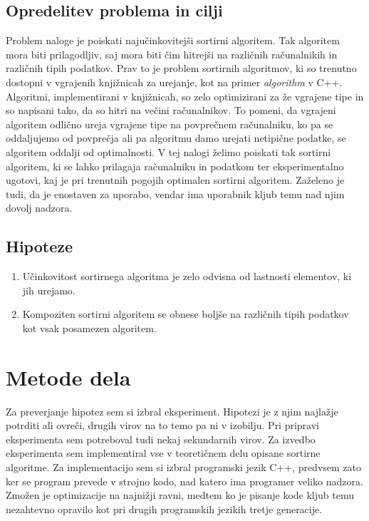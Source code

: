 \documentclass[a4paper,oneside,12pt]{article}
\begin{document}
\subsection{Opredelitev problema in cilji}
Problem naloge je poiskati najučinkovitejši sortirni algoritem. Tak algoritem
mora biti prilagodljiv, saj mora biti čim hitrejši na različnih računalnikih in
različnih tipih podatkov. Prav to je problem sortirnih algoritmov, ki so
trenutno dostopni v vgrajenih knjižnicah za urejanje, kot na primer
\emph{algorithm} v C++. Algoritmi, implementirani v knjižnicah, so zelo
optimizirani za že vgrajene tipe in so napisani tako, da so hitri na večini
računalnikov. To pomeni, da vgrajeni algoritem odlično ureja vgrajene tipe na
povprečnem računalniku, ko pa se oddaljujemo od povprečja ali pa algoritmu damo
urejati netipične podatke, se algoritem oddalji od optimalnosti. V tej nalogi
želimo poiskati tak sortirni algoritem, ki se lahko prilagaja računalniku in
podatkom ter eksperimentalno ugotovi, kaj je pri trenutnih pogojih optimalen
sortirni algoritem. Zaželeno je tudi, da je enostaven za uporabo, vendar ima uporabnik
kljub temu nad njim dovolj nadzora.

\subsection{Hipoteze}
\begin{enumerate}
  \item \label{hip:dif:type:dif:algo} Učinkovitost sortirnega
    algoritma je zelo odvisna od lastnosti elementov, ki jih urejamo.
  \item \label{hip:komp:vs:nekomp} Kompoziten sortirni algoritem se obnese boljše na različnih tipih podatkov kot vsak
    posamezen algoritem.
\end{enumerate}

\pagebreak
\mbox{}

\pagebreak

\section{Metode dela}
Za preverjanje hipotez sem si izbral eksperiment. Hipotezi je z njim najlažje
potrditi ali ovreči, drugih virov na to temo pa ni v izobilju. Pri pripravi eksperimenta
sem potreboval tudi nekaj sekundarnih virov. Za izvedbo eksperimenta sem implementiral vse 
v teoretičnem delu opisane sortirne algoritme. Za implementacijo sem si izbral programski 
jezik C++, predvsem zato ker se program prevede v strojno kodo, nad katero ima programer
veliko nadzora. Zmožen je optimizacije na najnižji ravni, medtem ko je pisanje kode kljub
temu nezahtevno opravilo kot pri drugih programskih jezikih tretje generacije.
\end{document}
